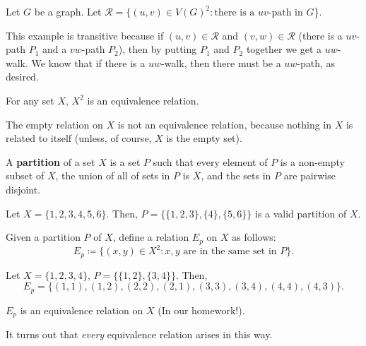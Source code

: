 \documentclass[a4paper]{article}
\begin{document}
\begin{eg}
	Let \( G \) be a graph. Let \( \mathcal{R}= \{(u,v) \in V(G)^2 \colon \text{there is a } uv\text{-path in } G  \)\}.
\end{eg}

This example is transitive because if \( (u,v) \in \mathcal{R} \) and \( (v,w) \in \mathcal{R} \) (there is a \( uv \)-path \( P_{1} \) and a \( vw \)-path \( P_{2} \)), then by putting \( P_{1}  \) and \( P_{2} \) together we get a \( uw \)-walk. We know that if there is a \( uw \)-walk, then there must be a \( uw \)-path, as desired.

\begin{eg}
	For any set \( X \), \( X^2 \) is an equivalence relation.
\end{eg}

\begin{note}
	The empty relation on \( X \) is not an equivalence relation, because nothing in \( X \) is related to itself (unless, of course, \( X \) is the empty set).
\end{note}

\begin{definition}
	A \textbf{partition} of a set \( X \) is a set \( P \) such that every element of \( P \) is a non-empty subset of \( X \), the union of all of sets in \( P \) is \( X \), and the sets in \( P \) are pairwise disjoint. 
\end{definition}

\begin{eg}
	Let \( X=\{1,2,3,4,5,6\}   \). Then, \( P = \{\{1,2,3\}, \{4\}, \{5,6\}    \}   \) is a valid partition of \( X \).
\end{eg}

Given a partition \( P \) of \( X \), define a relation \( E_p \) on \( X \) as follows: \[
	E_p \coloneq \{(x,y)\in X^2 \colon x,y \text{ are in the same set in } P\}  
.\] 

\begin{eg}
	Let \( X=\{1,2,3,4\}   \), \( P=\{\{1,2\} ,\{3,4\}   \}   \). Then, \[ E_p=\{(1,1),(1,2),(2,2),(2,1),(3,3),(3,4),(4,4),(4,3)\}   .\]
\end{eg}

\begin{property}
	\( E_p \) is an equivalence relation on \( X \) (In our homework!).
\end{property}

It turns out that \emph{every} equivalence relation arises in this way.
\end{document}
